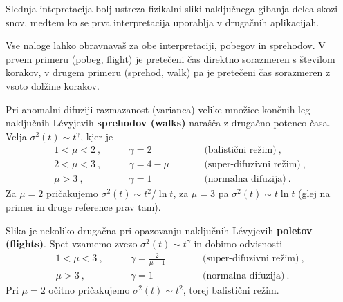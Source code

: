 \documentclass[slovene,11pt,a4paper]{article}
\begin{document}
Slednja intepretacija bolj ustreza fizikalni sliki naključnega gibanja delca skozi snov, medtem ko
se prva interpretacija uporablja v druga\v cnih aplikacijah.

Vse naloge lahko obravnavaš za obe interpretaciji, pobegov in sprehodov. V prvem primeru (pobeg, flight) je
prete\v ceni \v cas direktno sorazmeren s \v stevilom korakov, v drugem primeru (sprehod, walk) pa je
prete\v ceni \v cas  sorazmeren z vsoto dol\v zine korakov.


Pri anomalni difuziji razmazanost (varianca) velike množice
končnih leg naključnih L\'evyjevih \textbf{sprehodov (walks)} narašča z drugačno potenco časa.
Velja $\sigma^2(t) \sim t^\gamma$, kjer je
\begin{align*}
1 < \mu < 2 \>, &\qquad \gamma = 2 \> &\qquad&  \text{(balistični režim)}\>, \\
2 < \mu < 3 \>, &\qquad \gamma = 4 - \mu &\qquad&  \text{(super-difuzivni režim)}\>, \\
    \mu > 3 \>, &\qquad \gamma = 1 &\qquad&  \text{(normalna difuzija)} \>.
\end{align*}
Za $\mu=2$ pričakujemo $\sigma^2(t) \sim t^2 / \ln t$,
za $\mu=3$ pa $\sigma^2(t) \sim t \ln t$ (glej na primer \cite{weeks}
in druge reference prav tam).

Slika je nekoliko drugačna pri opazovanju naključnih L\'evyjevih \textbf{poletov (flights)}.
Spet vzamemo zvezo $\sigma^2(t) \sim t^\gamma$ in dobimo odvisnosti
\begin{align*}
1 < \mu < 3 \>, &\qquad \gamma = \frac{2}{\mu-1} \> &\qquad&  \text{(super-difuzivni režim)}\>, \\
    \mu > 3 \>, &\qquad \gamma = 1 &\qquad&  \text{(normalna difuzija)} \>.
\end{align*}
Pri $\mu=2$ očitno pričakujemo $\sigma^2(t) \sim t^2 $, torej balistični režim.
\newline
\end{document}
